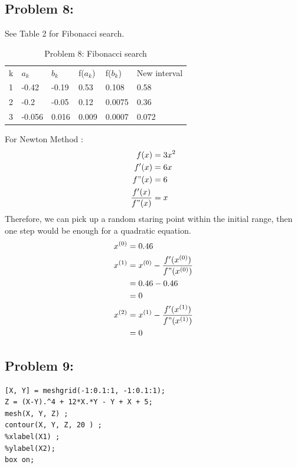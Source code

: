 \documentclass{article}
\begin{document}
\subsection*{Problem 8: } 
See Table 2 for Fibonacci search. 

\begin{table}[]
\centering
\caption{Problem 8:  Fibonacci search}
\label{my-label}
\begin{tabular}{llllll}
k & $a_k$   & $b_k$  & f($a_k$) & f($b_k$) & New interval \\
1 & -0.42  & -0.19 & 0.53    & 0.108   & 0.58         \\
2 & -0.2   & -0.05 & 0.12    & 0.0075  & 0.36         \\
3 & -0.056 & 0.016 & 0.009   & 0.0007  & 0.072       
\end{tabular}
\end{table}

For Newton Method :\\
\begin{align*} 
f(x) & = 3x^2\\
f'(x) & = 6x\\
f"(x) & = 6\\
\frac{f'(x)}{f"(x)} &= x\\
\end{align*} 
Therefore, we can pick up a random staring point within the initial range, then one step would be enough for a quadratic equation.
\begin{align*} 
x^{(0)} &= 0.46 \\
x^{(1)} & = x^{(0)} - \frac{f'(x^{(0)})}{f"(x^{(0)})} \\
& = 0.46 - 0.46 \\
& = 0 \\
x^{(2)} & = x^{(1)} - \frac{f'(x^{(1)})}{f"(x^{(1)})} \\
& = 0 \\
\end{align*} 

\subsection*{Problem 9: } 
\begin{lstlisting} 
[X, Y] = meshgrid(-1:0.1:1, -1:0.1:1); 
Z = (X-Y).^4 + 12*X.*Y - Y + X + 5; 
mesh(X, Y, Z) ; 
contour(X, Y, Z, 20 ) ; 
%xlabel(X1) ; 
%ylabel(X2); 
box on;
\end{lstlisting} 
\end{document}
